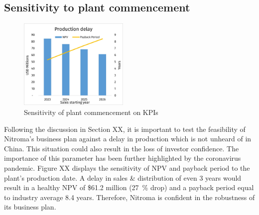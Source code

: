 \subsection{Sensitivity to plant commencement}
\begin{figure}
    \caption{Sensitivity of plant commencement on KPIs}
    \label{Sensitivity_ProductionDelay}
    \includegraphics[width=0.47\textwidth]{chapters/6-economics/figures/Sensitivity_ProductionDelay.jpg}
\end{figure}
Following the discussion in Section XX, it is important to test the feasibility of Nitroma’s business plan against a delay in production which is not unheard of in China.  This situation could also result in the loss of investor confidence. The importance of this parameter has been further highlighted by the coronavirus pandemic. Figure XX displays the sensitivity of NPV and payback period to the plant’s production date. A delay in sales \& distribution of even 3 years would result in a healthy NPV of \$61.2 million (\SI{27}{\percent} drop) and a payback period equal to industry average 8.4 years. Therefore, Nitroma is confident in the robustness of its business plan.

